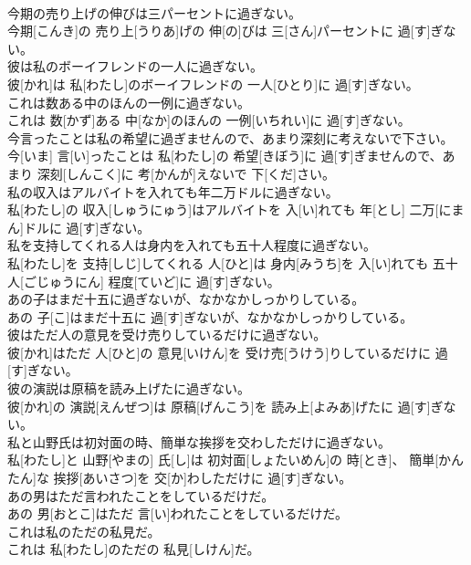 \documentclass[8pt]{extreport}
\begin{document}
\begin{CJK}{UTF8}{min}
\\	今期の売り上げの伸びは三パーセントに過ぎない。	
\\	今期[こんき]の 売り上[うりあ]げの 伸[の]びは 三[さん]パーセントに 過[す]ぎない。
\\	彼は私のボーイフレンドの一人に過ぎない。	
\\	彼[かれ]は 私[わたし]のボーイフレンドの 一人[ひとり]に 過[す]ぎない。
\\	これは数ある中のほんの一例に過ぎない。	
\\	これは 数[かず]ある 中[なか]のほんの 一例[いちれい]に 過[す]ぎない。
\\	今言ったことは私の希望に過ぎませんので、あまり深刻に考えないで下さい。	
\\	今[いま] 言[い]ったことは 私[わたし]の 希望[きぼう]に 過[す]ぎませんので、あまり 深刻[しんこく]に 考[かんが]えないで 下[くだ]さい。
\\	私の収入はアルバイトを入れても年二万ドルに過ぎない。	
\\	私[わたし]の 収入[しゅうにゅう]はアルバイトを 入[い]れても 年[とし] 二万[にまん]ドルに 過[す]ぎない。
\\	私を支持してくれる人は身内を入れても五十人程度に過ぎない。	
\\	私[わたし]を 支持[しじ]してくれる 人[ひと]は 身内[みうち]を 入[い]れても 五十人[ごじゅうにん] 程度[ていど]に 過[す]ぎない。
\\	あの子はまだ十五に過ぎないが、なかなかしっかりしている。	
\\	あの 子[こ]はまだ十五に 過[す]ぎないが、なかなかしっかりしている。
\\	彼はただ人の意見を受け売りしているだけに過ぎない。	
\\	彼[かれ]はただ 人[ひと]の 意見[いけん]を 受け売[うけう]りしているだけに 過[す]ぎない。
\\	彼の演説は原稿を読み上げたに過ぎない。	
\\	彼[かれ]の 演説[えんぜつ]は 原稿[げんこう]を 読み上[よみあ]げたに 過[す]ぎない。
\\	私と山野氏は初対面の時、簡単な挨拶を交わしただけに過ぎない。	
\\	私[わたし]と 山野[やまの] 氏[し]は 初対面[しょたいめん]の 時[とき]、 簡単[かんたん]な 挨拶[あいさつ]を 交[か]わしただけに 過[す]ぎない。
\\	あの男はただ言われたことをしているだけだ。	
\\	あの 男[おとこ]はただ 言[い]われたことをしているだけだ。
\\	これは私のただの私見だ。	
\\	これは 私[わたし]のただの 私見[しけん]だ。

\end{CJK}
\end{document}
